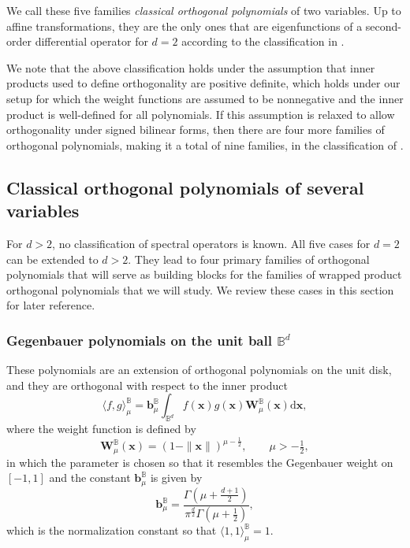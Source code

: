 \documentclass{amsart}
\theoremstyle{remark}
\def\la{{\langle}}
\def\ra{{\rangle}}
\def\d{\mathrm{d}}
\def\la{{\langle}}
\def\ra{{\rangle}}
\def\BB{{\mathbb B}}
\def\f{\frac}
\begin{document}
We call these five families {\it classical orthogonal polynomials} of two variables. Up to affine transformations, 
they are the only ones that are eigenfunctions of a second-order differential operator for $d =2$ according to 
the classification in \cite{KrSh}. 

We note that the above classification holds under the assumption that inner products used to define orthogonality 
are positive definite, which holds under our setup for which the weight functions are assumed to be nonnegative
and the inner product is well-defined for all polynomials. If this assumption is relaxed to allow orthogonality under 
signed bilinear forms, then there are four more families of orthogonal polynomials, 
making it a total of nine families, in the classification of \cite{KrSh}. 

\subsection{Classical orthogonal polynomials of several variables}
For $d > 2$, no classification of spectral operators is known. All five cases for $d =2$ can be extended to 
$d >2$. They lead to four primary families of orthogonal polynomials that will serve as building blocks for 
the families of wrapped product orthogonal polynomials that we will study. We review these 
cases in this section for later reference. 

\subsubsection{Gegenbauer polynomials on the unit ball $\BB^d$}
These polynomials are an extension of orthogonal polynomials on the unit disk, and they are orthogonal 
with respect to the inner product 
\begin{equation}\label{eq:B-ipd}
  \la f, g\ra_\mu^\BB = \bm b_\mu^\BB \int_{\BB^d} f(\bm x) g(\bm x) \bm W_\mu^\BB (\bm x) \d  \bm x,
\end{equation}
where the weight function is defined by 
\begin{equation}\label{eq:W_ball}
  \bm W^\BB_\mu(\bm x) = (1-\|\bm x\|)^{\mu-\f12}, \qquad \mu > -\tfrac12,
\end{equation}
in which the parameter is chosen so that it resembles the Gegenbauer weight on $[-1,1]$ and the 
constant $\bm b_\mu^\BB$ is given by 
\begin{equation}\label{eq:bB}
\bm b_\mu^\BB = \frac{\Gamma(\mu+\f{d+1}{2})}{\pi^{\f d 2}\Gamma(\mu+\f12)},
\end{equation}
which is the normalization constant so that $\la 1, 1\ra_\mu^\BB =1$. 
\end{document}
